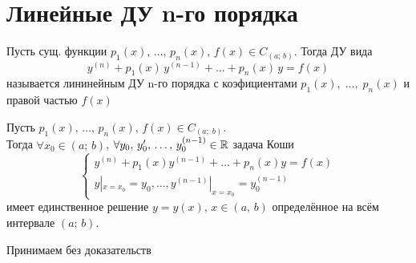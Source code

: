 \section{Линейные ДУ n-го порядка}

\begin{Def}
    Пусть сущ. функции $p_1(x),\, \dots,\, p_n(x),\, f(x) \in C_{(a;\,b)}$. Тогда ДУ вида
    \[
        y^{(n)} + p_1(x)\,y^{(n-1)} + \dots + p_n(x)\,y = f(x)
    \]
    называется лининейным ДУ n-го порядка с коэфициентами $p_1(x),\; \dots,\; p_n(x)$ и правой частью $f(x)$
\end{Def}

\begin{Th}
    Пусть $p_1(x),\, \dots,\, p_n(x), \,f(x) \in C_{(a;\;b)}$.\\ 
    Тогда $\forall x_0 \in (a;\,b)$, $\forall y_0,\, y_0',\, \dots,\, y_0^{(n-1)} \in \mathbb{R}$ задача Коши
    \[
        \begin{cases}
            y^{(n)}+p_1(x)y^{(n-1)}+\dots+p_n(x)y=f(x)\\
            y|_{x=x_0}=y_0, \dots , y^{(n-1)}|_{x=x_0}=y_0^{(n-1)}
        \end{cases}
    \]
    имеет единственное решение $y=y(x)$, $x\in (a,\,b)$ определённое на всём интервале $(a;\,b)$.
\end{Th}

\begin{Proof}
    Принимаем без доказательств
    
\end{Proof}

